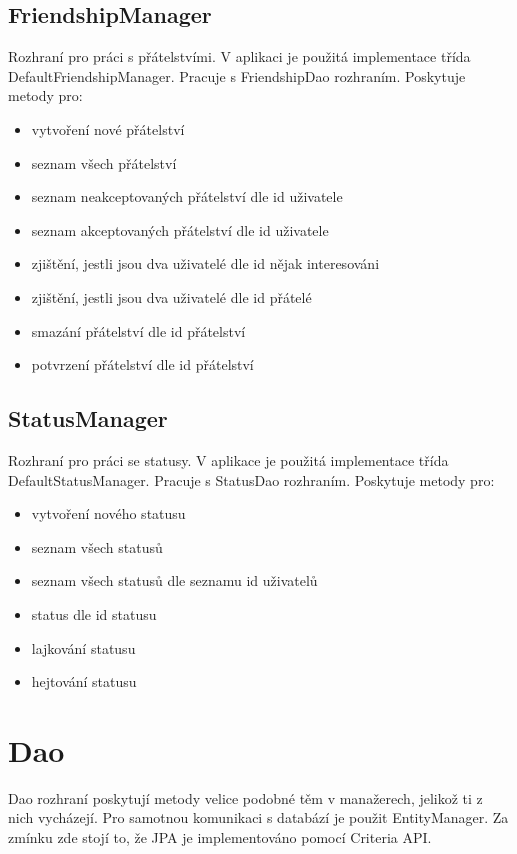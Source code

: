 \documentclass[
12pt,
a4paper,
pdftex,
czech,
titlepage
]{report}
\begin{document}
\subsection{FriendshipManager}

Rozhraní pro práci s přátelstvími. V aplikaci je použitá implementace třída DefaultFriendshipManager. Pracuje s FriendshipDao rozhraním. Poskytuje metody pro:

\begin{itemize}
\item vytvoření nové přátelství
\item seznam všech přátelství
\item seznam neakceptovaných přátelství dle id uživatele
\item seznam akceptovaných přátelství dle id uživatele
\item zjištění, jestli jsou dva uživatelé dle id nějak interesováni
\item zjištění, jestli jsou dva uživatelé dle id přátelé
\item smazání přátelství dle id přátelství
\item potvrzení přátelství dle id přátelství
\end{itemize}

\subsection{StatusManager}

Rozhraní pro práci se statusy. V aplikace je použitá implementace třída DefaultStatusManager. Pracuje s StatusDao rozhraním. Poskytuje metody pro:

\begin{itemize}
\item vytvoření nového statusu
\item seznam všech statusů
\item seznam všech statusů dle seznamu id uživatelů
\item status dle id statusu
\item lajkování statusu
\item hejtování statusu
\end{itemize}

\section{Dao}

Dao rozhraní poskytují metody velice podobné těm v manažerech, jelikož ti z nich vycházejí. Pro samotnou komunikaci s databází je použit EntityManager. Za zmínku zde stojí to, že JPA je implementováno pomocí Criteria API. 
\end{document}
